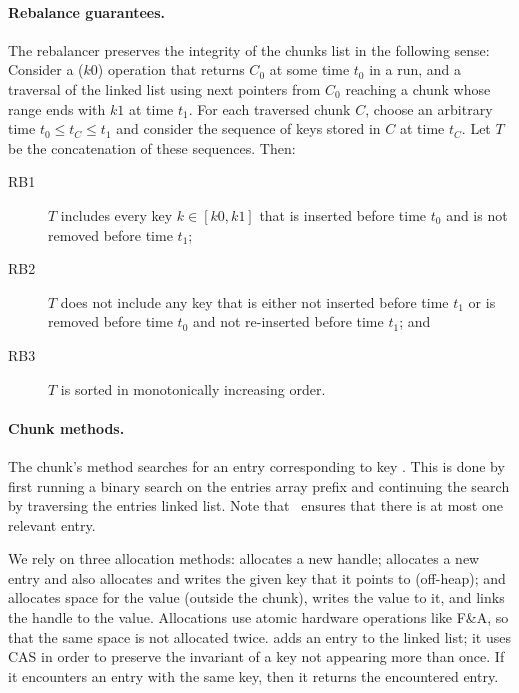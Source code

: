 \paragraph{Rebalance guarantees.}
The rebalancer preserves the integrity of the chunks  list in the following sense: Consider a 
($k0$) operation that returns $C_0$ at some time $t_0$ in a run, 
and a traversal of the linked list using {next} pointers from $C_0$ reaching a chunk whose range 
ends with $k1$ at time $t_1$. For each traversed chunk $C$, choose an arbitrary time $t_0 \le t_C \le t_1$ and 
consider the sequence of keys stored in $C$ at time $t_C$. 
Let $T$ be the concatenation of these sequences. 
Then:
\begin{description}
    \item[RB1] $T$ includes every key $k \in [k0,k1]$ that is inserted before time $t_0$ 
		and is not removed before time $t_1$; 
    \item[RB2] $T$ does not include any key that is either not inserted before time $t_1$ or is 
		removed before time $t_0$ and not re-inserted before time $t_1$; and 
    \item[RB3]   $T$ is sorted  in monotonically increasing order.
\end{description}

\paragraph{Chunk methods.}



The chunk's 
 method searches for an entry corresponding to  key . 
This is done by first running a binary search on the entries array prefix and continuing the search by traversing the entries linked list. 
Note that \oak\ ensures that there is at most one relevant entry.

We rely on three allocation methods:
 allocates a new handle;  
 allocates a new entry and also allocates and writes the given key that it points to (off-heap); and
 allocates space for the value (outside the chunk), writes the value to it, and links the handle to the value.
Allocations use atomic hardware operations like F\&A, so that the same space is not allocated twice.
%
 adds an entry to the linked list; it uses CAS in order 
to preserve the invariant of a key not appearing more than once.
If it encounters an  entry with the same key, then it returns the encountered entry.

